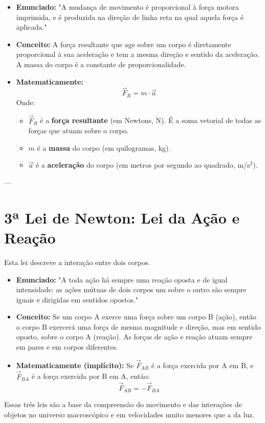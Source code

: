 \documentclass{article}
\begin{document}
\begin{itemize}
    \item \textbf{Enunciado:} "A mudança de movimento é proporcional à força motora imprimida, e é produzida na direção de linha reta na qual aquela força é aplicada."
    \item \textbf{Conceito:} A força resultante que age sobre um corpo é diretamente proporcional à sua aceleração e tem a mesma direção e sentido da aceleração. A massa do corpo é a constante de proporcionalidade.
    \item \textbf{Matematicamente:}
    $$ \vec{F}_{R} = m \cdot \vec{a} $$
    Onde:
    \begin{itemize}
        \item $\vec{F}_{R}$ é a \textbf{força resultante} (em Newtons, N). É a soma vetorial de todas as forças que atuam sobre o corpo.
        \item $m$ é a \textbf{massa} do corpo (em quilogramas, kg).
        \item $\vec{a}$ é a \textbf{aceleração} do corpo (em metros por segundo ao quadrado, m/s$^2$).
    \end{itemize}
\end{itemize}

---

\section{3ª Lei de Newton: Lei da Ação e Reação}

Esta lei descreve a interação entre dois corpos.

\begin{itemize}
    \item \textbf{Enunciado:} "A toda ação há sempre uma reação oposta e de igual intensidade: as ações mútuas de dois corpos um sobre o outro são sempre iguais e dirigidas em sentidos opostos."
    \item \textbf{Conceito:} Se um corpo A exerce uma força sobre um corpo B (ação), então o corpo B exercerá uma força de mesma magnitude e direção, mas em sentido oposto, sobre o corpo A (reação). As forças de ação e reação atuam sempre em pares e em corpos diferentes.
    \item \textbf{Matematicamente (implícito):} Se $\vec{F}_{AB}$ é a força exercida por A em B, e $\vec{F}_{BA}$ é a força exercida por B em A, então:
    $$ \vec{F}_{AB} = - \vec{F}_{BA} $$
\end{itemize}

Essas três leis são a base da compreensão do movimento e das interações de objetos no universo macroscópico e em velocidades muito menores que a da luz.
\end{document}

